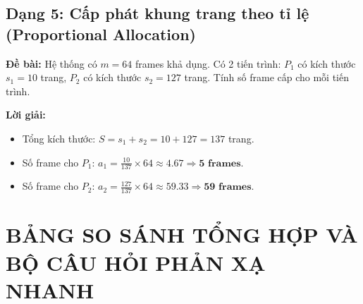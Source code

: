 \documentclass[11pt,a4paper]{article}
\begin{document}
\subsection{Dạng 5: Cấp phát khung trang theo tỉ lệ (Proportional Allocation)}
\begin{examplebox}
\textbf{Đề bài:} Hệ thống có $m = 64$ frames khả dụng. Có 2 tiến trình: $P_1$ có kích thước $s_1 = 10$ trang, $P_2$ có kích thước $s_2 = 127$ trang. Tính số frame cấp cho mỗi tiến trình.
\end{examplebox}
\textbf{Lời giải:}
\begin{itemize}[noitemsep]
    \item Tổng kích thước: $S = s_1 + s_2 = 10 + 127 = 137$ trang.
    \item Số frame cho $P_1$: $a_1 = \frac{10}{137} \times 64 \approx 4.67 \Rightarrow \mathbf{5\text{ frames}}$.
    \item Số frame cho $P_2$: $a_2 = \frac{127}{137} \times 64 \approx 59.33 \Rightarrow \mathbf{59\text{ frames}}$.
\end{itemize}

\newpage
\section{BẢNG SO SÁNH TỔNG HỢP VÀ BỘ CÂU HỎI PHẢN XẠ NHANH}
\end{document}

